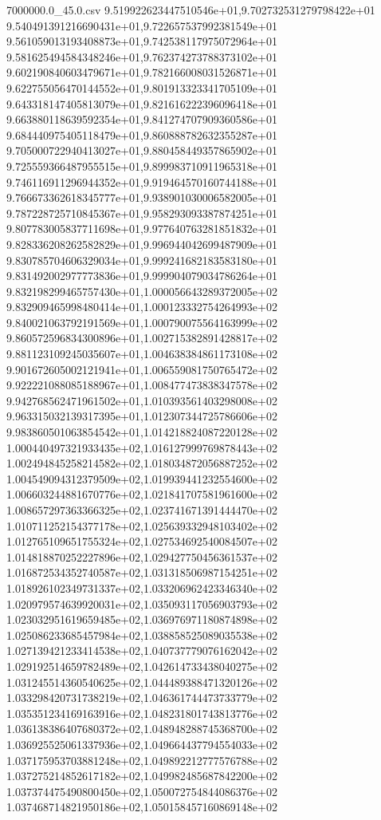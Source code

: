 \begin{filecontents*}{7000000.0_45.0.csv}
9.519922623447510546e+01,9.702732531279798422e+01
9.540491391216690431e+01,9.722657537992381549e+01
9.561059013193408873e+01,9.742538117975072964e+01
9.581625494584348246e+01,9.762374273788373102e+01
9.602190840603479671e+01,9.782166008031526871e+01
9.622755056470144552e+01,9.801913323341705109e+01
9.643318147405813079e+01,9.821616222396096418e+01
9.663880118639592354e+01,9.841274707909360586e+01
9.684440975405118479e+01,9.860888782632355287e+01
9.705000722940413027e+01,9.880458449357865902e+01
9.725559366487955515e+01,9.899983710911965318e+01
9.746116911296944352e+01,9.919464570160744188e+01
9.766673362618345777e+01,9.938901030006582005e+01
9.787228725710845367e+01,9.958293093387874251e+01
9.807783005837711698e+01,9.977640763281851832e+01
9.828336208262582829e+01,9.996944042699487909e+01
9.830785704606329034e+01,9.999241682183583180e+01
9.831492002977773836e+01,9.999904079034786264e+01
9.832198299465757430e+01,1.000056643289372005e+02
9.832909465998480414e+01,1.000123332754264993e+02
9.840021063792191569e+01,1.000790075564163999e+02
9.860572596834300896e+01,1.002715382891428817e+02
9.881123109245035607e+01,1.004638384861173108e+02
9.901672605002121941e+01,1.006559081750765472e+02
9.922221088085188967e+01,1.008477473838347578e+02
9.942768562471961502e+01,1.010393561403298008e+02
9.963315032139317395e+01,1.012307344725786606e+02
9.983860501063854542e+01,1.014218824087220128e+02
1.000440497321933435e+02,1.016127999769878443e+02
1.002494845258214582e+02,1.018034872056887252e+02
1.004549094312379509e+02,1.019939441232554600e+02
1.006603244881670776e+02,1.021841707581961600e+02
1.008657297363366325e+02,1.023741671391444470e+02
1.010711252154377178e+02,1.025639332948103402e+02
1.012765109651755324e+02,1.027534692540084507e+02
1.014818870252227896e+02,1.029427750456361537e+02
1.016872534352740587e+02,1.031318506987154251e+02
1.018926102349731337e+02,1.033206962423346340e+02
1.020979574639920031e+02,1.035093117056903793e+02
1.023032951619659485e+02,1.036976971180874898e+02
1.025086233685457984e+02,1.038858525089035538e+02
1.027139421233414538e+02,1.040737779076162042e+02
1.029192514659782489e+02,1.042614733438040275e+02
1.031245514360540625e+02,1.044489388471320126e+02
1.033298420731738219e+02,1.046361744473733779e+02
1.035351234169163916e+02,1.048231801743813776e+02
1.036138386407680372e+02,1.048948288745368700e+02
1.036925525061337936e+02,1.049664437794554033e+02
1.037175953703881248e+02,1.049892212777576788e+02
1.037275214852617182e+02,1.049982485687842200e+02
1.037374475490800450e+02,1.050072754844086376e+02
1.037468714821950186e+02,1.050158457160869148e+02

\end{filecontents*}
